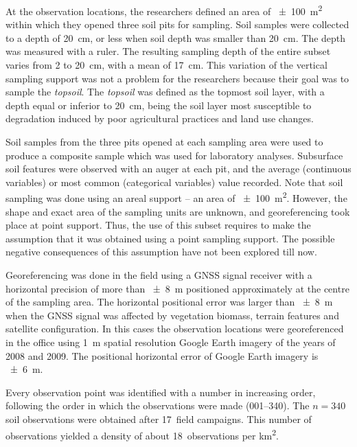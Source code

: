 At the observation locations, the researchers defined an area of \SI{\pm100}{\metre\squared} within which
they opened three soil pits for sampling. Soil samples were collected to a depth of \SI{20}{\centi\metre}, 
or less when soil depth was smaller than \SI{20}{\centi\metre}. The depth was measured with a ruler.
The resulting sampling depth of the entire subset varies from \num{2} to \SI{20}{\centi\metre}, with a 
mean of \SI{17}{\centi\metre}. This variation of the vertical sampling support was not a problem for the
researchers because their goal was to sample the \emph{topsoil}. The \emph{topsoil} was defined as the
topmost soil layer, with a depth equal or inferior to \SI{20}{\centi\metre}, being the soil layer most 
susceptible to degradation induced by poor agricultural practices and land use changes.

Soil samples from the three pits opened at each sampling area were used to produce a composite sample
which was used for laboratory analyses. Subsurface soil features were observed with an auger at each 
pit, and the average (continuous variables) or most common (categorical variables) value recorded. Note 
that soil sampling was done using an areal support -- an area of \SI{\pm100}{\metre\squared}. However, 
the shape and exact area of the sampling units are unknown, and georeferencing took place at point 
support. Thus, the use of this subset requires to make the assumption that it was obtained using a point
sampling support. The possible negative consequences of this assumption have not been explored till now.

Georeferencing was done in the field using a GNSS signal receiver with a horizontal precision of more 
than \SI{\pm8}{\metre} positioned approximately at the centre of the sampling area. The horizontal 
positional error was larger than \SI{\pm8}{\metre} when the GNSS signal was affected by vegetation 
biomass, terrain features and satellite configuration. In this cases the observation locations were 
georeferenced in the office using \SI{1}{\metre} spatial resolution Google Earth\textregistered{} 
imagery of the years of 2008 and 2009. The positional horizontal error of Google Earth\textregistered{} 
imagery is \SI{\pm6}{\metre}.

Every observation point was identified with a number in increasing order, following the order in which 
the observations were made (\num{001}--\num{340}). The $n = 340$ soil observations were obtained after
\num{17}~field campaigns. This number of observations yielded a density of about \num{18}~observations 
per \si{\kilo\metre\squared}.

